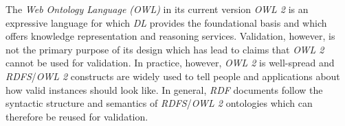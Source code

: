 \documentclass{acm_proc_article-sp}
\newcommand{\ms}[1]{%
  \texttt{#1}
}
\newcommand{\tb}[1]{\todo[size=\small, color=green!40]{\textbf{Thomas:} #1}}
\begin{document}
The \emph{Web Ontology Language (OWL)} in its current version \emph{OWL 2} is an expressive language 
for which \emph{DL} provides the foundational basis and
which offers knowledge representation and reasoning services. 
Validation, however, is not the primary purpose of its design which has lead to claims that \emph{OWL 2} cannot be used for validation. 
In practice, however, \emph{OWL 2} is well-spread and \emph{RDFS}/\emph{OWL 2} constructs are widely used to tell people and applications about how valid instances should look like.
In general, \emph{RDF} documents follow the syntactic structure and semantics of \emph{RDFS}/\emph{OWL 2} ontologies which can therefore be reused for validation. 
\end{document}
